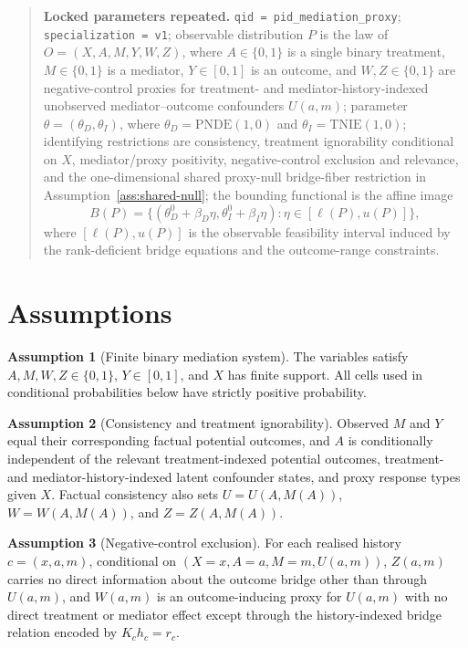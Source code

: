 \documentclass[11pt]{article}
\theoremstyle{definition}
\newtheorem{assumption}{Assumption}
\theoremstyle{plain}
\theoremstyle{remark}
\begin{document}
\begin{quote}
\textbf{Locked parameters repeated.}
\texttt{qid = pid\_mediation\_proxy};
\texttt{specialization = v1};
observable distribution \(P\) is the law of \(O=(X,A,M,Y,W,Z)\), where
\(A\in\{0,1\}\) is a single binary treatment, \(M\in\{0,1\}\) is a mediator,
\(Y\in[0,1]\) is an outcome, and \(W,Z\in\{0,1\}\) are negative-control
proxies for treatment- and mediator-history-indexed unobserved
mediator--outcome confounders \(U(a,m)\);
parameter \(\theta=(\theta_D,\theta_I)\), where
\(\theta_D=\mathrm{PNDE}(1,0)\) and \(\theta_I=\mathrm{TNIE}(1,0)\);
identifying restrictions are consistency, treatment ignorability conditional
on \(X\), mediator/proxy positivity, negative-control exclusion and relevance,
and the one-dimensional shared proxy-null bridge-fiber restriction in
Assumption~\ref{ass:shared-null};
the bounding functional is the affine image
\[
  B(P)=\{(\theta_D^0+\beta_D\eta,\theta_I^0+\beta_I\eta):
       \eta\in[\ell(P),u(P)]\},
\]
where \([\ell(P),u(P)]\) is the observable feasibility interval induced by
the rank-deficient bridge equations and the outcome-range constraints.
\end{quote}

\section{Assumptions}
\begin{assumption}[Finite binary mediation system]\label{ass:finite}
The variables satisfy \(A,M,W,Z\in\{0,1\}\), \(Y\in[0,1]\), and \(X\) has
finite support.  All cells used in conditional probabilities below have
strictly positive probability.
\end{assumption}

\begin{assumption}[Consistency and treatment ignorability]\label{ass:consistency}
Observed \(M\) and \(Y\) equal their corresponding factual potential outcomes,
and \(A\) is conditionally independent of the relevant treatment-indexed
potential outcomes, treatment- and mediator-history-indexed latent confounder
states, and proxy response types given \(X\).  Factual consistency also sets
\(U=U(A,M(A))\), \(W=W(A,M(A))\), and \(Z=Z(A,M(A))\).
\end{assumption}

\begin{assumption}[Negative-control exclusion]\label{ass:negative-control}
For each realised history \(c=(x,a,m)\), conditional on
\((X=x,A=a,M=m,U(a,m))\), \(Z(a,m)\) carries no direct information about the
outcome bridge other than through \(U(a,m)\), and \(W(a,m)\) is an
outcome-inducing proxy for \(U(a,m)\) with no direct treatment or mediator
effect except through the history-indexed bridge relation encoded by
\(K_c h_c=r_c\).
\end{assumption}
\end{document}
